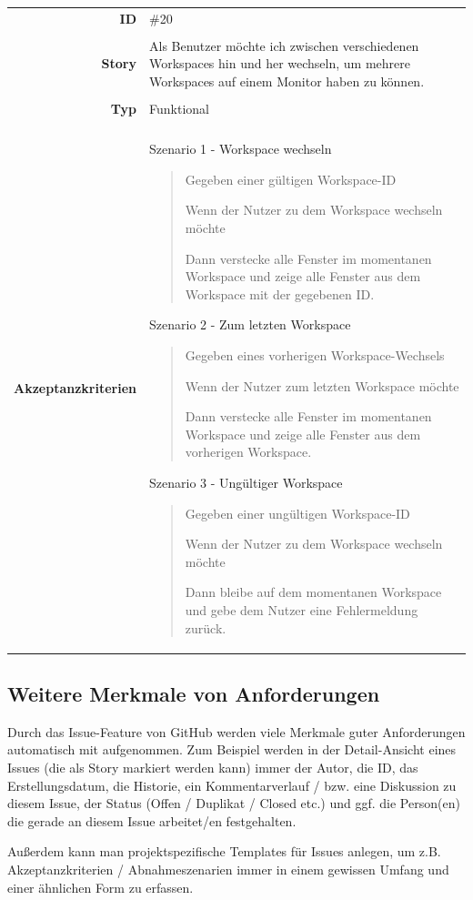 \documentclass{article}
\begin{document}
\begin{tabularx}{\textwidth}{r X}
	\textbf{ID}                 & \#20                                                                                                                                     \\
	\\
	\textbf{Story}              & Als Benutzer möchte ich zwischen verschiedenen Workspaces hin und her wechseln, um mehrere Workspaces auf einem Monitor haben zu können. \\
	\\
	\textbf{Typ}                & Funktional                                                                                                                               \\
	\\
	\textbf{Akzeptanzkriterien} & Szenario 1 - Workspace wechseln
	\begin{quote}
		Gegeben einer gültigen Workspace-ID

		Wenn der Nutzer zu dem Workspace wechseln möchte

		Dann verstecke alle Fenster im momentanen Workspace und zeige alle Fenster aus dem Workspace mit der gegebenen ID.
	\end{quote}
	Szenario 2 - Zum letzten Workspace
	\begin{quote}
		Gegeben eines vorherigen Workspace-Wechsels

		Wenn der Nutzer zum letzten Workspace möchte

		Dann verstecke alle Fenster im momentanen Workspace und zeige alle Fenster aus dem vorherigen Workspace.
	\end{quote}
	Szenario 3 - Ungültiger Workspace
	\begin{quote}
		Gegeben einer ungültigen Workspace-ID

		Wenn der Nutzer zu dem Workspace wechseln möchte

		Dann bleibe auf dem momentanen Workspace und gebe dem Nutzer eine Fehlermeldung zurück.
	\end{quote}
\end{tabularx}

\newpage

\subsection{Weitere Merkmale von Anforderungen}

Durch das Issue-Feature von GitHub werden viele Merkmale guter Anforderungen automatisch mit aufgenommen. Zum Beispiel werden
in der Detail-Ansicht eines Issues (die als Story markiert werden kann) immer der Autor, die ID, das Erstellungsdatum, die Historie,
ein Kommentarverlauf / bzw. eine Diskussion zu diesem Issue, der Status (Offen / Duplikat / Closed etc.) und ggf. die Person(en) die gerade
an diesem Issue arbeitet/en festgehalten. \par
Außerdem kann man projektspezifische Templates für Issues anlegen, um z.B. Akzeptanzkriterien / Abnahmeszenarien immer in einem
gewissen Umfang und einer ähnlichen Form zu erfassen.
\end{document}
